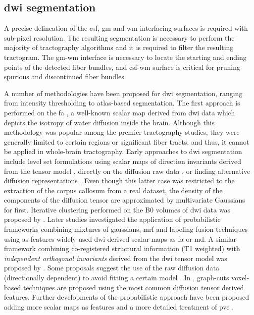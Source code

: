\subsection{\gls{dwi} segmentation}
\label{sec:dwi_segmentation}

A precise delineation of the \gls{csf}, \gls{gm} and \gls{wm} interfacing surfaces
is required with sub-pixel resolution.
The resulting segmentation is necessary to perform the majority of tractography 
algorithms and it is required to filter the resulting tractogram. The \gls{gm}-\gls{wm}
interface is necessary to locate the starting and ending points of the detected
fiber bundles, and \gls{csf}-\gls{wm} surface is critical for pruning spurious 
and discontinued fiber bundles.

A number of methodologies have been proposed for \gls{dwi} segmentation, ranging 
from intensity thresholding to atlas-based segmentation. The first approach is performed 
on the \gls{fa} \citep{ennis_orthogonal_2006}, a well-known scalar map derived from
\gls{dwi} data which depicts the isotropy of water diffusion inside the brain.
Although this methodology was popular among the premier tractography studies,
they were generally limited to certain regions or significant fiber tracts, and thus,
it cannot be applied in whole-brain tractography. Early approaches to \gls{dwi} segmentation 
include level set formulations using scalar maps of direction invariants derived
from the tensor model \citep{zhukov_level_2003}, directly on the diffusion raw data
\citep{rousson_level_2004}, or finding alternative diffusion representations 
\citep{jonasson_representing_2007}. Even though this latter case was restricted to the extraction of
the corpus callosum from a real dataset, the density of the components of the diffusion tensor
are approximated by multivariate Gaussians for first. Iterative clustering performed on the 
B0 volumes of \gls{dwi} data was proposed by \citep{hadjiprocopis_unbiased_2005}.
Later studies investigated the application of probabilistic frameworks combining mixtures of 
gaussians, \gls{mrf} and labeling fusion techniques \citep{liu_brain_2007} using as features 
widely-used \gls{dwi}-derived scalar maps as \gls{fa} or \gls{md}. A similar framework 
combining co-registered structural information (T1 weighted) with \emph{independent orthogonal 
invariants} derived from the \gls{dwi} tensor model was proposed by \citep{awate_multivariate_2008}. 
Some proposals suggest the use of the raw diffusion data (directionally dependent) to avoid fitting 
a certain model \citep{lu_segmentation_2008}. In \citep{han_experimental_2009}, graph-cuts 
voxel-based techniques are proposed using the most common diffusion tensor derived features.
Further developments of the probabilistic approach have been proposed adding more scalar maps
as features and a more detailed treatment of \gls{pve} \citep{kumazawa_partial_2010}.

